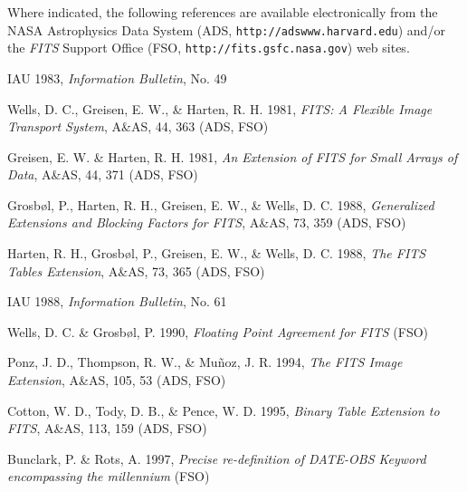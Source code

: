 \documentclass[11pt,makeidx]{book}     %
\begin{document}

\cleardoublepage

\begin{thebibliography}{9999}


  Where indicated, the following references are available electronically 
from the NASA Astrophysics Data System 
(ADS, {\tt http://adswww.harvard.edu}) and/or the 
{\em FITS\/} Support Office (FSO, {\tt http://fits.gsfc.nasa.gov}) web sites. 


  
 IAU 1983, {\it Information Bulletin}, No. 49

 Wells, D. C., Greisen, E. W., \& Harten, R. H. 1981, 
 {\it {\em FITS\/}: A Flexible Image Transport System}, 
 A\&AS,  44, 363  (ADS, FSO)
  
 Greisen, E. W. \& Harten, R. H. 1981, {\it An Extension of 
  {\em FITS\/} for Small Arrays of Data}, 
  A\&AS, 44, 371 (ADS, FSO)
             
 Grosb\o l, P., Harten, R. H., Greisen, E. W., \& Wells, D. C. 1988,
   {\it Generalized Extensions and Blocking Factors for {\em FITS}}, 
 A\&AS, 73, 359 (ADS, FSO)
  
 Harten, R. H., Grosb\o l, P., Greisen, E. W., \& Wells, D. C. 1988, 
   {\it The {\em FITS\/} Tables Extension}, 
    A\&AS, 73, 365 (ADS, FSO)

 IAU 1988, {\it Information Bulletin}, No. 61

 Wells, D. C. \& Grosb\o l, P. 1990, {\it Floating Point Agreement
   for
   {\em FITS}}  (FSO)

 Ponz, J. D., Thompson, R. W., \& Mu\~{n}oz, J. R. 1994,
   {\it The {\em FITS\/} Image Extension}, 
   A\&AS, 105, 53 (ADS, FSO)
  
 Cotton, W. D., Tody, D. B., \& Pence, W. D. 1995, {\it Binary 
    Table Extension to {\em FITS}}, 
    A\&AS, 113, 159 (ADS, FSO)
    
 Bunclark, P. \& Rots, A. 1997, {\it Precise re-definition of
   DATE-OBS Keyword encompassing the millennium} (FSO)


\end{thebibliography}
\end{document}
